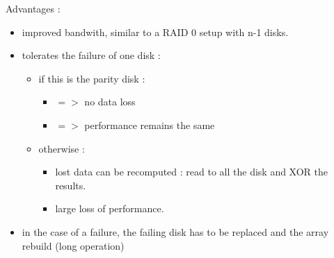 \documentclass[a4paper,10pt]{report}
\newlength{\larg}
\begin{document}
Advantages :

\begin{itemize}
  \item improved bandwith, similar to a RAID 0 setup with n-1 disks.
  \item tolerates the failure of one disk :
  \begin{itemize}
    \item if this is the parity disk :
    \begin{itemize}
      \item $=>$ no data loss
      \item $=>$ performance remains the same
    \end{itemize}
    \item otherwise :
    \begin{itemize}
      \item lost data can be recomputed : read to all the disk and XOR the results.
      \item large loss of performance.
    \end{itemize}
  \end{itemize}
  \item in the case of a failure, the failing disk has to be replaced and the array rebuild (long operation)
\end{itemize}
\end{document}
